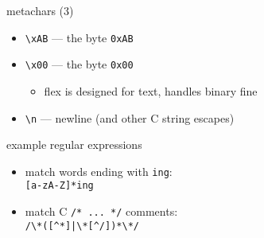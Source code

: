 \begin{frame}[fragile,label=meta3]{metachars (3)}
    \begin{itemize}
    \item \verb|\xAB| --- the byte {\tt 0xAB}
    \item \verb|\x00| --- the byte {\tt 0x00}
        \begin{itemize}
        \item flex is designed for text, handles binary fine
        \end{itemize}
    \item \verb|\n| --- newline (and other C string escapes)
    \end{itemize}
\end{frame}

\begin{frame}[fragile,label=example1]{example regular expressions}
    \begin{itemize}
    \item match words ending with {\tt ing}: \\
        \verb|[a-zA-Z]*ing|
    \item match C {\tt /* ... */} comments: \\
        \verb!/\*([^*]|\*[^/])*\*/!
    \end{itemize}
\end{frame}


